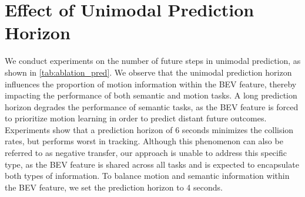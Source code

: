 \begin{table*}[t]
\centering
{}
\caption{\textbf{Effect of queue length on UniAD.}}
\label{tab:queue_length}
\end{table*}


\section{Effect of Unimodal Prediction Horizon}
We conduct experiments on the number of future steps in unimodal prediction, as shown in \cref{tab:ablation_pred}. We observe that the unimodal prediction horizon influences the proportion of motion information within the \gls{BEV} feature, thereby impacting the performance of both semantic and motion tasks. A long prediction horizon degrades the performance of semantic tasks, as the \gls{BEV} feature is forced to prioritize motion learning in order to predict distant future outcomes. Experiments show that a prediction horizon of 6 seconds minimizes the collision rates, but performs worst in tracking.
Although this phenomenon can also be referred to as negative transfer, our approach is unable to address this specific type, as the \gls{BEV} feature is shared across all tasks and is expected to encapsulate both types of information. To balance motion and semantic information within the BEV feature, we set the prediction horizon to 4 seconds.



